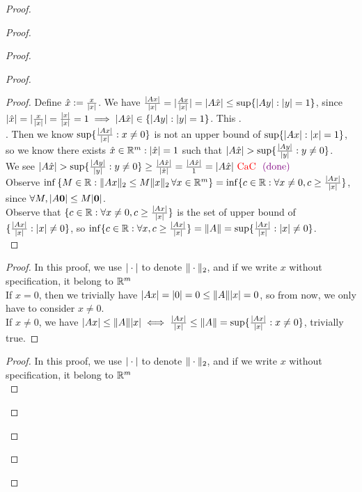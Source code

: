 \documentclass{report}
\begin{document}
\begin{proof}
\begin{proof}
\begin{proof}
\begin{proof}
\begin{proof}
Define $\hat{x}:=\frac{x}{|x|}$. We have $\frac{|Ax|}{|x|}=|\frac{Ax}{|x|}|=|A \hat{x}|\leq \sup \{ |Ay|:|y|=1 \}
$, since $|\hat{x}|=|\frac{x}{|x|}|=\frac{|x|}{|x|}=1\implies |A \hat{x}|\in \{ |Ay|:|y|=1 \}$. This \CaC.\\

. Then we know $\sup \{ \frac{|Ax|}{|x|}:x\neq 0 \}$ is not an upper bound of $\sup \{ |Ax|:|x|=1 \}$, so we know there exists $\hat{x} \in \mathbb{R}^m:|\hat{x}|=1$ such that $\abso{A \hat{x}}>\sup \set{\frac{\abso{Ay}}{\abso{y}}:y\neq 0}$.\\

We see $\abso{A \hat{x}}>\sup \set{\frac{\abso{Ay}}{\abso{y}}:y\neq 0}\geq \frac{\abso{A \hat{x}}}{\abso{\hat{x}}}=\frac{\abso{A \hat{x}}}{1}=\abso{A \hat{x}}\tCaC \vdone$\\

Observe $  \inf \left\{ M \in \mathbb{R} : \|Ax\|_2 \leq M \|x\|_2 \, \forall x \in \mathbb{R}^m \right\}= \inf \{ c \in \mathbb{R}: \forall x\neq 0, c\geq \frac{|Ax|}{|x|} \}$, since $\forall M, |A\textbf{0}|\leq M|\textbf{0}|$.\\

Observe that $   \{ c \in \mathbb{R}: \forall x\neq 0, c\geq \frac{|Ax|}{|x|} \}$ is the set of upper bound of $\{ \frac{|Ax|}{|x|}:|x|\neq 0 \}$, so $\inf   \{ c \in \mathbb{R}: \forall x, c\geq \frac{|Ax|}{|x|} \}=\| A \|=\sup \{ \frac{|Ax|}{|x|}:|x|\neq 0 \}$.\\
\end{proof}
\begin{proof}
In this proof, we use $|\cdot|$ to denote $\| \cdot \|_2$, and if we write $x$ without specification, it belong to  $\mathbb{R}^m$\\

If $x=0$, then we trivially have  $|Ax|=|0|=0\leq \| A \||x|=0$, so from now, we only have to consider $x\neq 0$.\\

If $x\neq 0$, we have $|Ax|\leq \| A \||x|\iff \frac{|Ax|}{|x|}\leq \| A \|=\sup \{ \frac{|Ax|}{|x|}:x\neq 0 \}$, trivially true.
\end{proof}
\begin{proof}
In this proof, we use $|\cdot|$ to denote $\| \cdot \|_2$, and if we write $x$ without specification, it belong to  $\mathbb{R}^m$\\


\end{proof}
\end{proof}
\end{proof}
\end{proof}
\end{proof}
\end{document}
